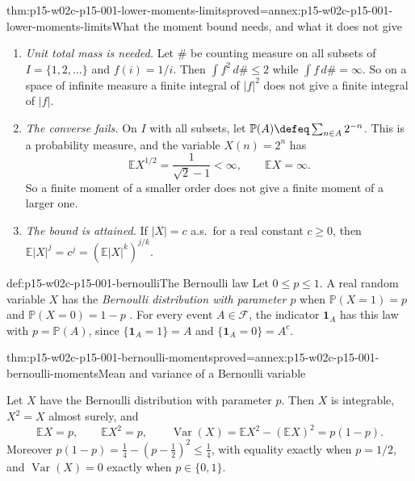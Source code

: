 \begin{hbtheorem}{thm:p15-w02c-p15-001-lower-moments-limits}{proved=annex:p15-w02c-p15-001-lower-moments-limits}{What the moment bound needs, and what it does not give}
\par\nobreak
\begin{enumerate}
\item \emph{Unit total mass is needed.} Let \(\#\) be counting measure on
      all subsets of \(I=\{1,2,\ldots\}\) and \(f(i)=1/i\). Then
      \(\int f^2\,d\#\leq2\) while \(\int f\,d\#=\infty\). So on a
      space of infinite measure a finite integral of \(|f|^2\) does not give
      a finite integral of \(|f|\).
\item \emph{The converse fails.} On \(I\) with all subsets, let
      \(\mathbb P(A)\defeq\sum_{n\in A}2^{-n}\). This is a probability
      measure, and the variable \(X(n)=2^n\) has
      \[
       \mathbb E X^{1/2}=\frac1{\sqrt2-1}<\infty,\qquad
       \mathbb EX=\infty .
      \]
      So a finite moment of a smaller order does not give a finite moment
      of a larger one.
\item \emph{The bound is attained.} If \(|X|=c\) a.s.\ for a real
      constant \(c\geq0\), then
      \(\mathbb E|X|^j=c^j=(\mathbb E|X|^k)^{j/k}\).
\end{enumerate}
\end{hbtheorem}

\begin{hbdefinition}{def:p15-w02c-p15-001-bernoulli}{The Bernoulli law}
Let \(0\leq p\leq1\). A real random variable \(X\) has the
\emph{Bernoulli distribution with parameter \(p\)} when
\(\mathbb P(X=1)=p\) and \(\mathbb P(X=0)=1-p\)
\cite[example~1.6.12, p.~34]{DurrettPTEAuthor2019}. For every event
\(A\in\mathcal F\), the indicator \(\mathbf1_A\) has this law with
\(p=\mathbb P(A)\), since \(\{\mathbf1_A=1\}=A\) and
\(\{\mathbf1_A=0\}=A^c\).
\end{hbdefinition}

\begin{hbtheorem}{thm:p15-w02c-p15-001-bernoulli-moments}{proved=annex:p15-w02c-p15-001-bernoulli-moments}{Mean and variance of a Bernoulli variable}
\par\nobreak
Let \(X\) have the Bernoulli distribution with parameter \(p\). Then
\(X\) is integrable, \(X^2=X\) almost surely, and
\[
 \mathbb EX=p,\qquad \mathbb EX^2=p,\qquad
 \operatorname{Var}(X)=\mathbb EX^2-(\mathbb EX)^2=p(1-p).
\]
Moreover \(p(1-p)=\tfrac14-(p-\tfrac12)^2\leq\tfrac14\), with equality
exactly when \(p=1/2\), and \(\operatorname{Var}(X)=0\) exactly when
\(p\in\{0,1\}\).
\end{hbtheorem}

